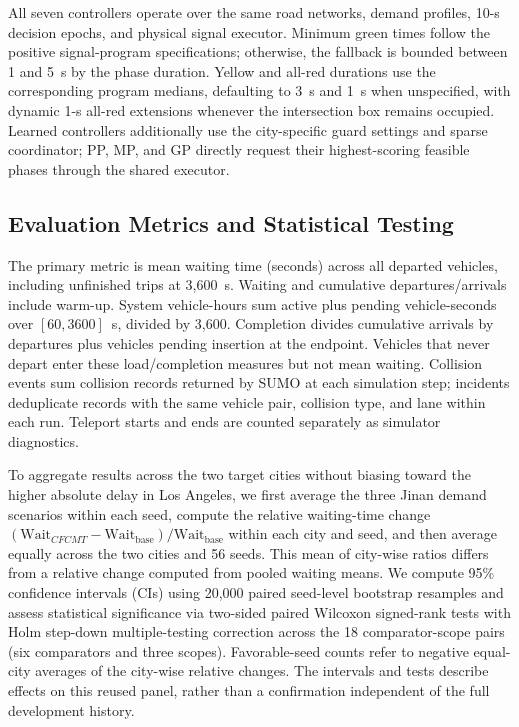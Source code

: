 \documentclass[letterpaper,journal]{IEEEtran}
\newcommand{\method}{CFCMT}
\begin{document}
All seven controllers operate over the same road networks, demand profiles, 10-s decision epochs, and physical signal executor. Minimum green times follow the positive signal-program specifications; otherwise, the fallback is bounded between 1 and 5~s by the phase duration. Yellow and all-red durations use the corresponding program medians, defaulting to 3~s and 1~s when unspecified, with dynamic 1-s all-red extensions whenever the intersection box remains occupied. Learned controllers additionally use the city-specific guard settings and sparse coordinator; PP, MP, and GP directly request their highest-scoring feasible phases through the shared executor.

\subsection{Evaluation Metrics and Statistical Testing}
The primary metric is mean waiting time (seconds) across all departed vehicles, including unfinished trips at 3,600~s. Waiting and cumulative departures/arrivals include warm-up. System vehicle-hours sum active plus pending vehicle-seconds over $[60,3600]$~s, divided by 3,600. Completion divides cumulative arrivals by departures plus vehicles pending insertion at the endpoint. Vehicles that never depart enter these load/completion measures but not mean waiting. Collision events sum collision records returned by SUMO at each simulation step; incidents deduplicate records with the same vehicle pair, collision type, and lane within each run. Teleport starts and ends are counted separately as simulator diagnostics.

To aggregate results across the two target cities without biasing toward the higher absolute delay in Los Angeles, we first average the three Jinan demand scenarios within each seed, compute the relative waiting-time change $(\text{Wait}_{\method} - \text{Wait}_{\mathrm{base}}) / \text{Wait}_{\mathrm{base}}$ within each city and seed, and then average equally across the two cities and 56 seeds. This mean of city-wise ratios differs from a relative change computed from pooled waiting means. We compute 95\% confidence intervals (CIs) using 20,000 paired seed-level bootstrap resamples and assess statistical significance via two-sided paired Wilcoxon signed-rank tests with Holm step-down multiple-testing correction across the 18 comparator-scope pairs (six comparators and three scopes). Favorable-seed counts refer to negative equal-city averages of the city-wise relative changes. The intervals and tests describe effects on this reused panel, rather than a confirmation independent of the full development history.
\end{document}
